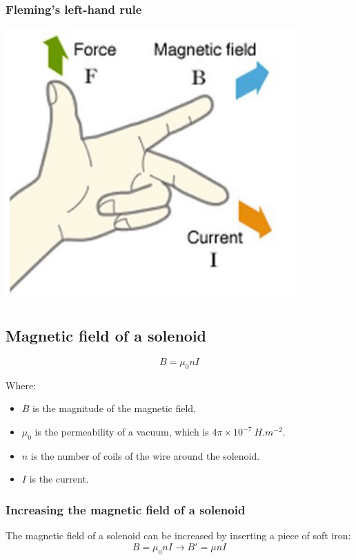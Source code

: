 \documentclass[11pt]{article}
\begin{document}
\subsubsection{Fleming's left-hand rule}
\label{sec:org4b6e147}

\begin{center}
\includegraphics[scale=0.6]{./images/flemings-left-hand-rule.png}
\end{center}

\subsection{Magnetic field of a solenoid}
\label{sec:org594ef69}
\[B = \mu_0 n I\]

Where:
\begin{itemize}
\item \(B\) is the magnitude of the magnetic field.
\item \(\mu_0\) is the permeability of a vacuum, which is \(4 \pi \times 10^{-7} \ \unit{H.m^{-2}}\).
\item \(n\) is the number of coils of the wire around the solenoid.
\item \(I\) is the current.
\end{itemize}

\subsubsection{Increasing the magnetic field of a solenoid}
\label{sec:org00bb7f3}
The magnetic field of a solenoid can be increased by inserting a piece of soft iron:
\[B = \mu_0 n I \rightarrow B' = \mu nI\]
\end{document}
